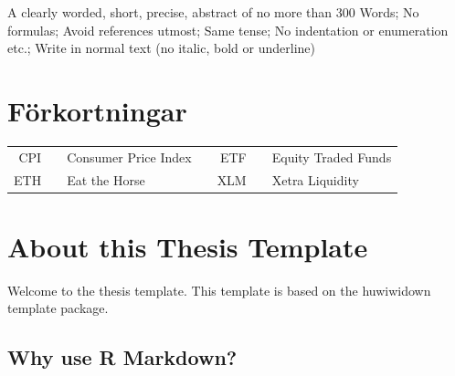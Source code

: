 \documentclass[a4paper,11pt]{article}
\begin{document}
A clearly worded, short, precise, abstract of no more than 300 Words; No formulas; Avoid references utmost; Same tense; No indentation or enumeration etc.; Write in normal text (no italic, bold or underline)

\newpage
\tableofcontents
\clearpage

\newpage
\hypertarget{fuxf6rkortningar}{%
\section*{Förkortningar}\label{fuxf6rkortningar}}
\begin{tabular}{rp{0.2cm}lp{1cm}rp{0.2cm}l}
    CPI     & &  Consumer Price Index   & & ETF     & &  Equity Traded Funds  \\
    ETH     & &  Eat the Horse          & & XLM     & &  Xetra Liquidity
\end{tabular}
\newpage
\listoffigures
{}

\newpage
\listoftables
{}

\newpage
\pagestyle{plain}
\setcounter{page}{1}    %

\hypertarget{about-this-thesis-template}{%
\section*{About this Thesis Template}\label{about-this-thesis-template}}

Welcome to the thesis template. This template is based on the huwiwidown template package.

\hypertarget{why-use-r-markdown}{%
\subsection*{Why use R Markdown?}\label{why-use-r-markdown}}
\end{document}
